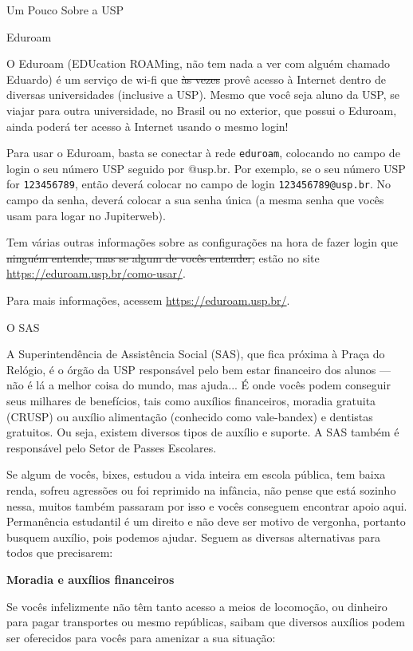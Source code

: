 \begin{secao}{Um Pouco Sobre a USP}
\begin{subsecao}{Eduroam}

O Eduroam (EDUcation ROAMing, não tem nada a ver com alguém chamado Eduardo) é um
serviço de wi-fi que \sout{às vezes} provê acesso à Internet dentro de diversas
universidades (inclusive a USP). Mesmo que você seja aluno da USP, se viajar para
outra universidade, no Brasil ou no exterior, que possui o Eduroam, ainda poderá ter
acesso à Internet usando o mesmo login!

Para usar o Eduroam, basta se conectar à rede \texttt{eduroam}, colocando no campo
de login o seu número USP seguido por @usp.br. Por exemplo, se o seu número USP for
\texttt{123456789}, então deverá colocar no campo de login \texttt{123456789@usp.br}.
No campo da senha, deverá colocar a sua senha única (a mesma senha que vocês usam
para logar no Jupiterweb).

Tem várias outras informações sobre as configurações na hora de fazer login que
\sout{ninguém entende, mas se algum de vocês entender,} estão no site
\url{https://eduroam.usp.br/como-usar/}.

Para mais informações, acessem \url{https://eduroam.usp.br/}.

\end{subsecao}

\begin{subsecao}{O SAS}

A Superintendência de Assistência Social (SAS), que fica próxima à Praça do
Relógio, é o órgão da USP responsável pelo bem estar financeiro dos alunos — não
é lá a melhor coisa do mundo, mas ajuda... É onde vocês podem conseguir seus
milhares de benefícios, tais como auxílios financeiros, moradia gratuita (CRUSP)
ou auxílio alimentação (conhecido como vale-bandex) e dentistas gratuitos. Ou
seja, existem diversos tipos de auxílio e suporte. A SAS também é responsável
pelo Setor de Passes Escolares.

Se algum de vocês, bixes, estudou a vida inteira em escola pública, tem baixa renda,
sofreu agressões ou foi reprimido na infância, não pense que está sozinho nessa,
muitos também passaram por isso e vocês conseguem encontrar apoio aqui. Permanência
estudantil é um direito e não deve ser motivo de vergonha, portanto busquem
auxílio, pois podemos ajudar. Seguem as diversas alternativas para todos 
que precisarem:

\textbf{Moradia e auxílios financeiros}

Se vocês infelizmente não têm tanto acesso a meios de locomoção, ou dinheiro para
pagar transportes ou mesmo repúblicas, saibam que diversos auxílios podem ser
oferecidos para vocês para amenizar a sua situação:


\end{subsecao}
\end{secao}
